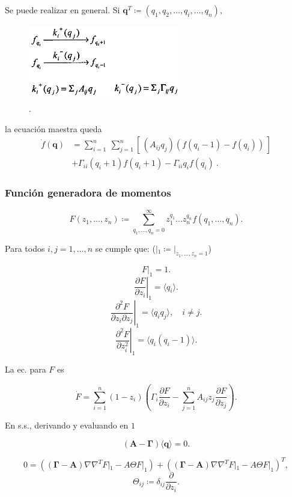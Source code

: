 \documentclass[10pt]{beamer}
\begin{document}
\begin{frame}
Se puede realizar en general. Si $\mathbf{q}^T \coloneqq (q_1,q_2,\dots,q_i,\dots,q_n)$, 
\begin{figure}[p]
    \centering
    \includegraphics[width=0.6\textwidth]{scheme2.png}\\
    \tiny \cite{thattai01}.
\end{figure}
la ecuaci\'on maestra queda
\begin{align*}
\dot{f}(\mathbf{q}) &= \sum_{i=1}^n \: \sum_{j=1}^n \left[\, \left(A_{ij}q_j\right) \left(f(q_i-1) - f(q_i)\right) \, \right] \\
 & + \Gamma_{ii}(q_{i}+1)f(q_i+1) -\Gamma_{ii}q_if(q_i) \: .
\end{align*}
\end{frame}

\begin{frame}
\frametitle{Funci\'on generadora de momentos}

$$F(z_1,\dots,z_n) \coloneqq \sum^{\infty}_{q_1,\dots,q_n = 0}z_1^{q_1} \dots z_n^{q_n}f(q_1,\dots,q_n).$$

Para todos $i, j = 1,\dots,n$  se cumple que: ($|_1 \coloneqq |_{z_1,\dots,z_n=1}$)

$$ \left. F\right|_1 = 1. $$
$$ \left. \frac{\partial F}{\partial z_i} \right|_1 = \langle q_i \rangle. $$
$$ \left. \frac{\partial^2 F}{\partial z_i \partial z_j} \right|_1 = \langle q_iq_j \rangle, \quad i\neq j.$$
$$ \left. \frac{\partial^2 F}{\partial z_i^2} \right|_1 = \langle q_i(q_i - 1) \rangle. $$
\end{frame}

\begin{frame}
La ec. para $F$ es

$$\dot{F} = \sum_{i=1}^n(1-z_i)\left(\Gamma_i\frac{\partial F}{\partial z_i} - \sum_{j=1}^n A_{ij}z_j\frac{\partial F}{\partial z_j} \right).$$

En s.s., derivando y evaluando en $1$

$$\left(\mathbf{A} - \mathbf{\Gamma}\right)\langle \mathbf{q} \rangle = 0.$$

$$0 = \left( \left( \mathbf{\Gamma} - \mathbf{A}\right) \nabla\nabla^TF|_1 - A\Theta F|_1 \right) +  \left( \left( \mathbf{\Gamma} - \mathbf{A}\right) \nabla\nabla^TF|_1 - A\Theta F|_1\right)^T,$$ 
$$\Theta_{ij} \coloneqq \delta_{ij}\frac{\partial}{\partial z_i}.$$

\end{frame}
\end{document}
